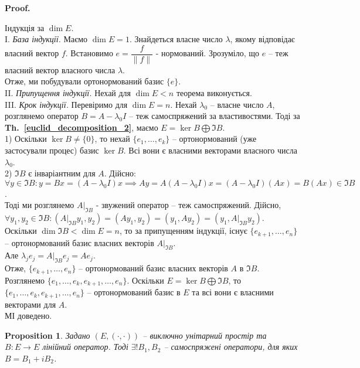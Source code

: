 \documentclass[a4paper, 10pt]{article}
\makeatletter
\theoremstyle{theoremdd}
\newtheorem{proposition}[theorem]{Proposition}
\newcommand\thref[1]{\textbf{Th.~\ref{#1}}}
\renewenvironment{proof}[1][Proof.\\]{\par
\pushQED{\hfill \qed}%
\normalfont \topsep6\p@\@plus6\p@\relax
\trivlist
\item\relax
{\bfseries
#1\@addpunct{.}}\hspace\labelsep\ignorespaces
}{%
\popQED\endtrivlist\@endpefalse
}
\makeatother
\begin{document}
\begin{proof}
Індукція за $\dim E$.\\
I. \textit{База індукції.} Маємо $\dim E = 1$. Знайдеться власне число $\lambda$, якому відповідає власний вектор $f$. Встановимо $e = \dfrac{f}{\|f\|}$ - нормований. Зрозуміло, що $e$ -- теж власний вектор власного числа $\lambda$.\\
Отже, ми побудували ортонормований базис $\{e\}$.
\bigskip \\
II. \textit{Припущення індукції.} Нехай для $\dim E < n$ теорема виконується.\\
III. \textit{Крок індукції.} Перевіримо для $\dim E = n$. Нехай $\lambda_0$ -- власне число $A$, розглянемо оператор $B = A - \lambda_0 I$ -- теж самоспряжений за властивостями. Тоді за \thref{euclid_decomposition_2}, маємо $E = \ker B \bigoplus \Im B$.\\
1) Оскільки $\ker B \neq \{0\}$, то нехай $\{e_1,\dots,e_k\}$ -- ортонормований (уже застосували процес) базис $\ker B$. Всі вони є власними векторами власного числа $\lambda_0$.\\
2) $\Im B$ є інваріантним для $A$. Дійсно:\\
$\forall y \in \Im B: y = Bx = (A-\lambda_0 I)x \implies Ay = A(A-\lambda_0 I)x = (A-\lambda_0 I)(Ax) = B(Ax) \in \Im B$.\\
Тоді ми розглянемо  $A|_{\Im B}$ - звужений оператор -- теж самоспряжений. Дійсно,\\
$\forall y_1,y_2 \in \Im B: (A|_{\Im B} y_1, y_2) = (Ay_1, y_2) = (y_1, Ay_2) = (y_1, A|_{\Im B} y_2)$.\\
Оскільки $\dim \Im B < \dim E = n$, то за припущенням індукції, існує $\{e_{k+1},\dots,e_n\}$ -- ортонормований базис власних векторів $A|_{\Im B}$.\\
Але $\lambda_j e_j = A|_{\Im B} e_j = Ae_j$.\\
Отже, $\{e_{k+1},\dots,e_n\}$ -- ортонормований базис власних векторів $A$ в $\Im B$.\\
Розглянемо $\{e_1,\dots,e_k,e_{k+1},\dots,e_n\}$. Оскільки $E = \ker B \bigoplus \Im B$, то $\{e_1,\dots,e_k,e_{k+1},\dots,e_n\}$ -- ортонормований базис в $E$ та всі вони є власними векторами для $A$.\\
МІ доведено.
\end{proof}

\begin{proposition}
Задано $(E,(\cdot,\cdot))$ -- виключно унітарний простір та $B \colon E \to E$ лінійний оператор. Тоді $\exists! B_1,B_2$ -- самоспряжені оператори, для яких $B = B_1 + i B_2$.
\end{proposition}
\end{document}
